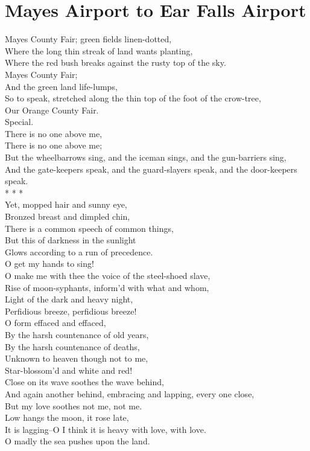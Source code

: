 \documentclass[smalldemyvopaper,11pt,twoside,onecolumn,openright,extrafontsizes]{memoir}
\begin{document}
\chapter{Mayes Airport to Ear Falls Airport}
Mayes County Fair; green fields linen-dotted,
\\Where the long thin streak of land wants planting,
\\Where the red bush breaks against the rusty top of the sky.
\\Mayes County Fair;
\\And the green land life-lumps,
\\So to speak, stretched along the thin top of the foot of the crow-tree,
\\Our Orange County Fair.
\\Special.
\\There is no one above me,
\\There is no one above me;
\\But the wheelbarrows sing, and the iceman sings, and the gun-barriers sing,
\\And the gate-keepers speak, and the guard-slayers speak, and the door-keepers speak.
\\*        *        *
\\Yet, mopped hair and sunny eye,
\\Bronzed breast and dimpled chin,
\\There is a common speech of common things,
\\But this of darkness in the sunlight
\\Glows according to a run of precedence.
\\O get my hands to sing!
\\O make me with thee the voice of the steel-shoed slave,
\\Rise of moon-syphants, inform'd with what and whom,
\\Light of the dark and heavy night,
\\Perfidious breeze, perfidious breeze!
\\O form effaced and effaced,
\\By the harsh countenance of old years,
\\By the harsh countenance of deaths,
\\Unknown to heaven though not to me,
\\Star-blossom'd and white and red!
\\Close on its wave soothes the wave behind,
\\And again another behind, embracing and lapping, every one close,
\\But my love soothes not me, not me.
\\Low hangs the moon, it rose late,
\\It is lagging--O I think it is heavy with love, with love.
\\O madly the sea pushes upon the land.
\end{document}
